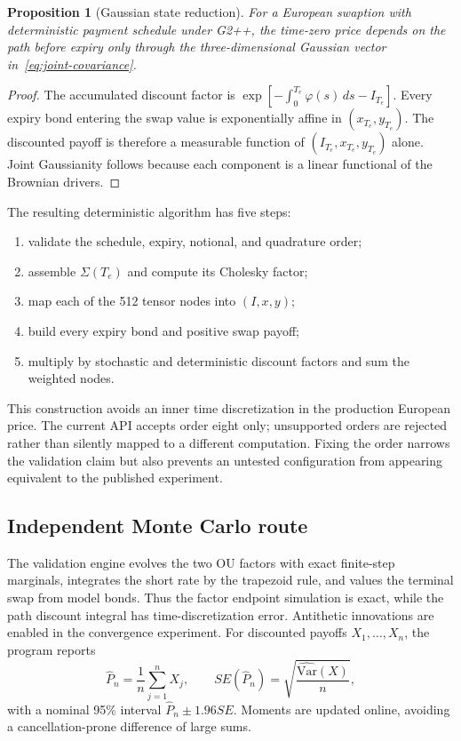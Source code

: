 \documentclass[11pt]{article}
\numberwithin{equation}{section}
\newtheorem{proposition}{Proposition}[section]
\theoremstyle{definition}
\theoremstyle{remark}
\begin{document}
\begin{proposition}[Gaussian state reduction]
For a European swaption with deterministic payment schedule under G2++, the
time-zero price depends on the path before expiry only through the
three-dimensional Gaussian vector in~\eqref{eq:joint-covariance}.
\end{proposition}
\begin{proof}
The accumulated discount factor is
$\exp[-\int_0^{T_e}\varphi(s)\,ds-I_{T_e}]$. Every expiry bond entering the
swap value is exponentially affine in $(x_{T_e},y_{T_e})$. The discounted
payoff is therefore a measurable function of
$(I_{T_e},x_{T_e},y_{T_e})$ alone. Joint Gaussianity follows because each
component is a linear functional of the Brownian drivers.
\end{proof}

The resulting deterministic algorithm has five steps:
\begin{enumerate}
  \item validate the schedule, expiry, notional, and quadrature order;
  \item assemble $\Sigma(T_e)$ and compute its Cholesky factor;
  \item map each of the 512 tensor nodes into $(I,x,y)$;
  \item build every expiry bond and positive swap payoff;
  \item multiply by stochastic and deterministic discount factors and sum the
  weighted nodes.
\end{enumerate}
This construction avoids an inner time discretization in the production
European price. The current API accepts order eight only; unsupported orders
are rejected rather than silently mapped to a different computation. Fixing the
order narrows the validation claim but also prevents an untested configuration
from appearing equivalent to the published experiment.

\subsection{Independent Monte Carlo route}

The validation engine evolves the two OU factors with exact finite-step
marginals, integrates the short rate by the trapezoid rule, and values the
terminal swap from model bonds. Thus the factor endpoint simulation is exact,
while the path discount integral has time-discretization error. Antithetic
innovations are enabled in the convergence experiment. For discounted payoffs
$X_1,\ldots,X_n$, the program reports
\begin{equation}
  \widehat{P}_n=\frac1n\sum_{j=1}^n X_j,\qquad
  SE(\widehat{P}_n)=\sqrt{\frac{\widehat{\mathrm{Var}}(X)}{n}},
\end{equation}
with a nominal 95\% interval $\widehat{P}_n\pm1.96SE$. Moments are updated
online, avoiding a cancellation-prone difference of large sums.
\end{document}
